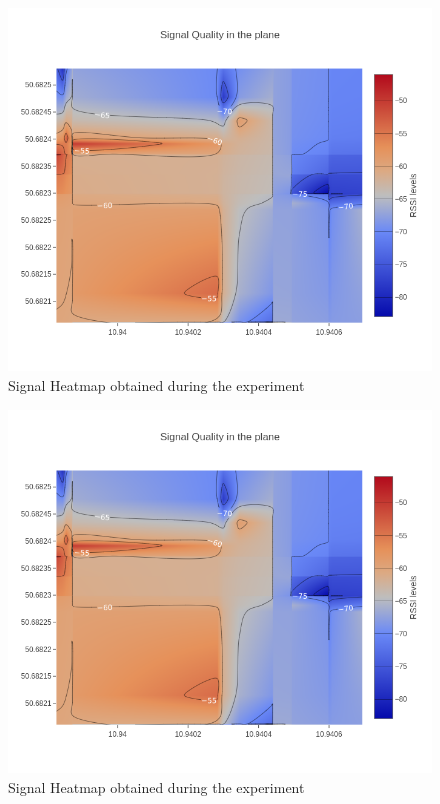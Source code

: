 \begin{figure}[H]
	\centering
	\includegraphics[width=\linewidth,keepaspectratio]{images/Exp4_Overall_Heatmap.png}
\caption{Signal Heatmap obtained during the experiment}
\end{figure}

\begin{figure}[H]
	\centering
	\includegraphics[width=\linewidth,keepaspectratio]{images/Exp4_Overall_Heatmap.png}
\caption{Signal Heatmap obtained during the experiment}
\end{figure}

